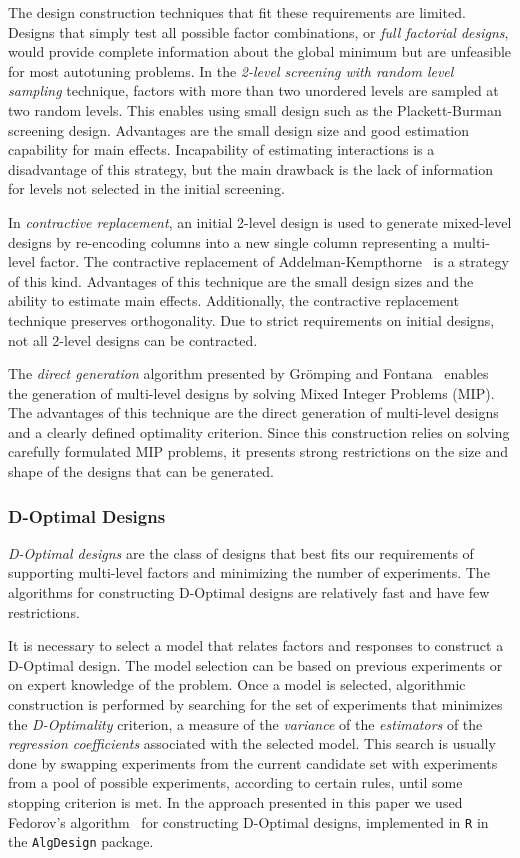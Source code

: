 \documentclass[conference]{IEEEtran}
\begin{document}
The design construction techniques that fit these requirements are limited.
Designs that simply test all possible factor combinations, or \emph{full factorial
designs}, would provide complete information about the global minimum but are
unfeasible for most autotuning problems. In the \emph{2-level screening with random
level sampling} technique, factors with more than two unordered levels are
sampled at two random levels. This enables using small design such as the
Plackett-Burman~\cite{plackett1946design} screening design. Advantages are
the small design size and good estimation capability for main effects.
Incapability of estimating interactions is a disadvantage of this strategy, but
the main drawback is the lack of information for levels not selected in the
initial screening.

In \emph{contractive replacement}, an initial 2-level design is used to generate
mixed-level designs by re-encoding columns into a new single column representing
a multi-level factor. The contractive replacement of
Addelman-Kempthorne~\cite{addelman1961some} is a strategy of this kind.
Advantages of this technique are the small design sizes and the ability to
estimate main effects. Additionally, the contractive replacement technique
preserves orthogonality. Due to strict requirements on initial designs, not all
2-level designs can be contracted.

The \emph{direct generation} algorithm presented by Grömping and
Fontana~\cite{ulrike2018algorithm} enables the generation of multi-level
designs by solving Mixed Integer Problems (MIP). The advantages of this
technique are the direct generation of multi-level designs and a clearly defined
optimality criterion. Since this construction relies on solving carefully
formulated MIP problems, it presents strong restrictions on the size and shape
of the designs that can be generated.
\subsubsection{D-Optimal Designs}
\label{sec:org3cbb08d}
\emph{D-Optimal designs} are the class of designs that best fits our requirements of
supporting multi-level factors and minimizing the number of experiments. The
algorithms for constructing D-Optimal designs are relatively fast and have few
restrictions.

It is necessary to select a model that relates factors and responses to
construct a D-Optimal design. The model selection can be based on previous
experiments or on expert knowledge of the problem. Once a model is selected,
algorithmic construction is performed by searching for the set of experiments
that minimizes the \emph{D-Optimality} criterion, a measure of the \emph{variance} of the
\emph{estimators} of the \emph{regression coefficients} associated with the selected
model. This search is usually done by swapping experiments from the current
candidate set with experiments from a pool of possible experiments, according to
certain rules, until some stopping criterion is met. In the approach presented
in this paper we used Fedorov's algorithm~\cite{fedorov1972theory} for
constructing D-Optimal designs, implemented in \texttt{R} in the \texttt{AlgDesign} package.
\end{document}

